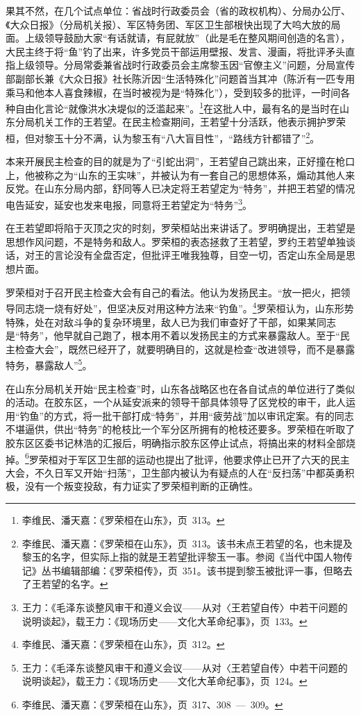 果其不然，在几个试点单位：省战时行政委员会（省的政权机构）、分局办公厅、《大众日报》（分局机关报）、军区特务团、军区卫生部根快出现了大呜大放的局面。上级领导鼓励大家“有话就请，有屁就放”（此是毛在整风期间创造的名言），大民主终于将“鱼”钓了出来，许多党员干部运用壁报、发言、漫画，将批评矛头直指上级领导。分局常委兼省战时行政委员会主席黎玉因“官僚主义”问题，分局宣传部副部长兼《大众日报》社长陈沂因“生活特殊化”问题首当其冲（陈沂有一匹专用乘马和他本人喜食辣椒，在当时被视为是“特殊化”），受到较多的批评，一时间各种自由化言论“就像洪水决堤似的泛滥起来”。\footnote{李维民、潘天嘉：《罗荣桓在山东》，页~313。}在这批人中，最有名的是当时在山东分局机关工作的王若望。在民主检查期间，王若望十分活跃，他表示拥护罗荣桓，但对黎玉十分不满，认为黎玉有“八大盲目性”，“路线方针都错了”\footnote{李维民、潘天嘉：《罗荣桓在山东》，页~313。该书未点王若望的名，也未提及黎玉的名字，但实际上指的就是王若望批评黎玉一事。参阅《当代中国人物传记》丛书编辑部编：《罗荣桓传》，页~351。该书提到黎玉被批评一事，但略去了王若望的名字。}。

本来开展民主检查的目的就是为了“引蛇出洞”，王若望自己跳出来，正好撞在枪口上，他被称之为“山东的王实味”，并被认为有一套自己的思想体系，煽动其他人来反党。在山东分局内部，舒同等人已决定将王若望定为“特务”，并把王若望的情况电告延安，延安也发来电报，同意将王若望定为“特务”\footnote{王力：《毛泽东谈整风审干和遵义会议——从对〈王若望自传〉中若干问题的说明谈起》，载王力：《现场历史——文化大革命纪事》，页~133。}。

在王若望即将陷于灭顶之灾的时刻，罗荣桓站出来讲话了。罗明确提出，王若望是思想作风问题，不是特务和敌人。罗荣桓的表态拯救了王若望，罗约王若望单独谈话，对王的言论没有全盘否定，但批评王唯我独尊，目空一切，否定山东全局是思想片面。

罗荣桓对于召开民主检查大会有自己的看法。他认为发扬民主。“放一把火，把领导同志烧一烧有好处”，但坚决反对用这种方法来“钓鱼”。\footnote{李维民、潘天嘉：《罗荣桓在山东》，页~312。}罗荣桓认为，山东形势特殊，处在对敌斗争的复杂环境里，敌人已为我们审查好了干部，如果某同志是“特务”，他早就自己跑了，根本用不着以发扬民主的方式来暴露敌人。至于“民主检查大会”，既然已经开了，就要明确目的，这就是检查“改进领导，而不是暴露特务，暴露敌人”\footnote{王力：《毛泽东谈整风审干和遵义会议——从对〈王若望自传〉中若干问题的说明谈起》，载王力：《现场历史——文化大革命纪事》，页~124。}。

在山东分局机关开始“民主检查”时，山东各战略区也在各自试点的单位进行了类似的活动。在胶东区，一个从延安派来的领导干部具体领导了区党校的审干，此人运用“钓鱼”的方式，将一批干部打成“特务”，并用“疲劳战”加以审讯定案。有的同志不堪逼供，供出“特务”的枪枝比一个军分区所拥有的枪枝还要多。罗荣桓在听取了胶东区区委书记林浩的汇报后，明确指示胶东区停止试点，将搞出来的材料全部烧掉。\footnote{李维民、潘天嘉：《罗荣桓在山东》，页~317、308~—~309。}罗荣桓对于军区卫生部的运动也提出了批评，他要求停止已开了六天的民主大会，不久日军又开始“扫荡”，卫生部内被认为有疑点的人在“反扫荡”中都英勇积极，没有一个叛变投敌，有力证实了罗荣桓判断的正确性。

